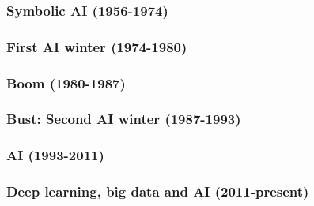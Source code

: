 \subsubsection{Symbolic AI (1956-1974)}
\subsubsection{First AI winter (1974-1980)}
\subsubsection{Boom (1980-1987)}
\subsubsection{Bust: Second AI winter (1987-1993)}
\subsubsection{AI (1993-2011)}
\subsubsection{Deep learning, big data and AI (2011-present)}


%
%
%

